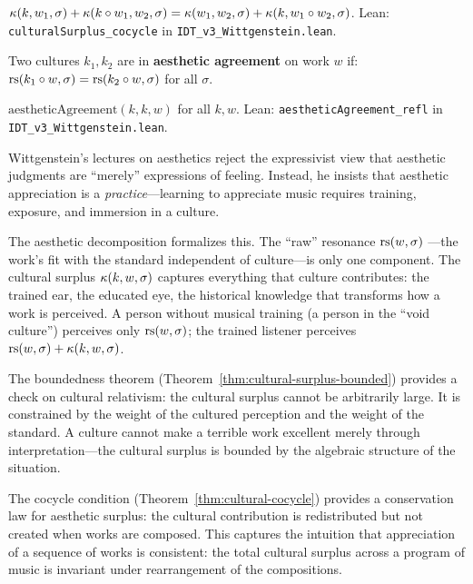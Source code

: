 \begin{theorem}
\label{thm:cultural-cocycle}
$\kappa(k, w_1, \sigma) + \kappa(k \circ w_1, w_2, \sigma) =
\kappa(w_1, w_2, \sigma) + \kappa(k, w_1 \circ w_2, \sigma)$.
Lean: \texttt{culturalSurplus\_cocycle} in \texttt{IDT\_v3\_Wittgenstein.lean}.
\end{theorem}

\begin{definition}
\label{def:aesthetic-agreement}
Two cultures $k_1, k_2$ are in \textbf{aesthetic agreement} on work $w$ if:
$\mathrm{rs}(k_1 \circ w, \sigma) = \mathrm{rs}(k_2 \circ w, \sigma)$ for all $\sigma$.
\end{definition}

\begin{theorem}
$\mathrm{aestheticAgreement}(k, k, w)$ for all $k, w$.
Lean: \texttt{aestheticAgreement\_refl} in \texttt{IDT\_v3\_Wittgenstein.lean}.
\end{theorem}

\begin{interpretation}
Wittgenstein's lectures on aesthetics reject the expressivist view that
aesthetic judgments are ``merely'' expressions of feeling. Instead, he insists
that aesthetic appreciation is a \emph{practice}---learning to appreciate
music requires training, exposure, and immersion in a culture.

The aesthetic decomposition formalizes this. The ``raw'' resonance $\mathrm{rs}(w, \sigma)$
---the work's fit with the standard independent of culture---is only one
component. The cultural surplus $\kappa(k, w, \sigma)$ captures everything
that culture contributes: the trained ear, the educated eye, the historical
knowledge that transforms how a work is perceived. A person without musical
training (a person in the ``void culture'') perceives only $\mathrm{rs}(w, \sigma)$;
the trained listener perceives $\mathrm{rs}(w, \sigma) + \kappa(k, w, \sigma)$.

The boundedness theorem (Theorem~\ref{thm:cultural-surplus-bounded}) provides
a check on cultural relativism: the cultural surplus cannot be arbitrarily
large. It is constrained by the weight of the cultured perception and the
weight of the standard. A culture cannot make a terrible work excellent
merely through interpretation---the cultural surplus is bounded by the
algebraic structure of the situation.

The cocycle condition (Theorem~\ref{thm:cultural-cocycle}) provides a
conservation law for aesthetic surplus: the cultural contribution is
redistributed but not created when works are composed. This captures the
intuition that appreciation of a sequence of works is consistent: the total
cultural surplus across a program of music is invariant under rearrangement
of the compositions.
\end{interpretation}


